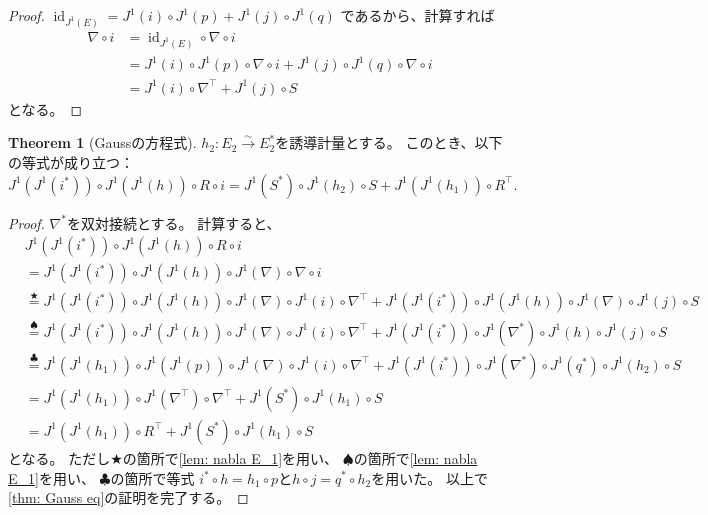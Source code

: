\documentclass[uplatex]{jsarticle}
\theoremstyle{definition}
\newtheorem{thm}{Theorem}[section]
\DeclareMathOperator{\id}{\mathrm{id}}
\begin{document}
\begin{proof}
  \(\id_{J^1(E)} = J^1(i)\circ J^1(p) + J^1(j) \circ J^1(q)\)
  であるから、計算すれば
  \begin{align*}
    \nabla\circ i &= \id_{J^1(E)} \circ \nabla \circ i \\
    &= J^1(i)\circ J^1(p) \circ \nabla \circ i
    + J^1(j) \circ J^1(q) \circ \nabla \circ i \\
    &= J^1(i)\circ \nabla^{\top} + J^1(j) \circ S
  \end{align*}
  となる。
\end{proof}


\begin{thm}[Gaussの方程式]
  \label{thm: Gauss eq}
  \(h_2:E_2 \xrightarrow{\sim} E_2^*\)を誘導計量とする。
  このとき、以下の等式が成り立つ：
  \[
  J^1(J^1(i^*)) \circ J^1(J^1(h)) \circ R \circ i
  = J^1(S^*) \circ J^1(h_2) \circ S + J^1(J^1(h_1))\circ R^{\top}.
  \]
\end{thm}

\begin{proof}
  \(\nabla^*\)を双対接続とする。
  計算すると、
  \begin{align*}
    &J^1(J^1(i^*)) \circ J^1(J^1(h)) \circ R \circ i \\
    &= J^1(J^1(i^*)) \circ J^1(J^1(h)) \circ J^1(\nabla) \circ \nabla \circ i \\
    &\overset{\bigstar}{=}
    J^1(J^1(i^*)) \circ J^1(J^1(h)) \circ J^1(\nabla) \circ J^1(i) \circ \nabla^{\top}
    + J^1(J^1(i^*)) \circ J^1(J^1(h)) \circ J^1(\nabla) \circ J^1(j) \circ S \\
    &\overset{\spadesuit}{=}
    J^1(J^1(i^*)) \circ J^1(J^1(h)) \circ J^1(\nabla) \circ J^1(i) \circ \nabla^{\top}
    + J^1(J^1(i^*)) \circ J^1(\nabla^*) \circ J^1(h) \circ J^1(j) \circ S \\
    &\overset{\clubsuit}{=}
    J^1(J^1(h_1)) \circ J^1(J^1(p)) \circ J^1(\nabla) \circ J^1(i) \circ \nabla^{\top}
    + J^1(J^1(i^*)) \circ J^1(\nabla^*) \circ J^1(q^*) \circ J^1(h_2) \circ S \\
    &= J^1(J^1(h_1)) \circ J^1(\nabla^{\top}) \circ \nabla^{\top}
    + J^1(S^*) \circ J^1(h_1) \circ S \\
    &= J^1(J^1(h_1)) \circ R^{\top} + J^1(S^*) \circ J^1(h_1) \circ S
  \end{align*}
  となる。
  ただし\(\bigstar\)の箇所で\autoref{lem: nabla E_1}を用い、
  \(\spadesuit\)の箇所で\autoref{lem: nabla E_1}を用い、
  \(\clubsuit\)の箇所で等式
  \(i^*\circ h = h_1\circ p\)と\(h\circ j = q^* \circ h_2\)を用いた。
  以上で\autoref{thm: Gauss eq}の証明を完了する。
\end{proof}
\end{document}
